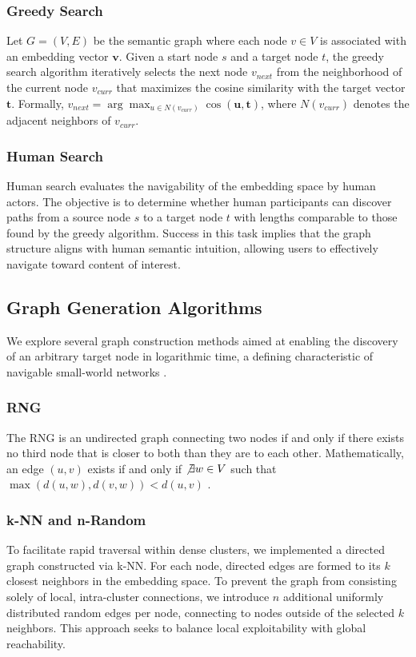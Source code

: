 \documentclass{article}
\begin{document}
\subsubsection{Greedy Search}
Let $G = (V, E)$ be the semantic graph where each node $v \in V$ is associated with an embedding vector $\mathbf{v}$. Given a start node $s$ and a target node $t$, the greedy search algorithm iteratively selects the next node $v_{next}$ from the neighborhood of the current node $v_{curr}$ that maximizes the cosine similarity with the target vector $\mathbf{t}$. Formally, $v_{next} = \arg\max_{u \in N(v_{curr})} \cos(\mathbf{u}, \mathbf{t})$, where $N(v_{curr})$ denotes the adjacent neighbors of $v_{curr}$.

\subsubsection{Human Search}
Human search evaluates the navigability of the embedding space by human actors. The objective is to determine whether human participants can discover paths from a source node $s$ to a target node $t$ with lengths comparable to those found by the greedy algorithm. Success in this task implies that the graph structure aligns with human semantic intuition, allowing users to effectively navigate toward content of interest.

\subsection{Graph Generation Algorithms}
We explore several graph construction methods aimed at enabling the discovery of an arbitrary target node in logarithmic time, a defining characteristic of navigable small-world networks \cite{DBLP:journals/corr/MalkovY16}.

\subsubsection{\ac{RNG}}
The \ac{RNG} is an undirected graph connecting two nodes if and only if there exists no third node that is closer to both than they are to each other. Mathematically, an edge $(u, v)$ exists if and only if $\not\exists w \in V$ such that $\max(d(u, w), d(v, w)) < d(u, v)$ \cite{TOUSSAINT1980261}.

\subsubsection{\ac{k-NN} and n-Random}
To facilitate rapid traversal within dense clusters, we implemented a directed graph constructed via \ac{k-NN}. For each node, directed edges are formed to its $k$ closest neighbors in the embedding space. To prevent the graph from consisting solely of local, intra-cluster connections, we introduce $n$ additional uniformly distributed random edges per node, connecting to nodes outside of the selected $k$ neighbors. This approach seeks to balance local exploitability with global reachability.
\end{document}
